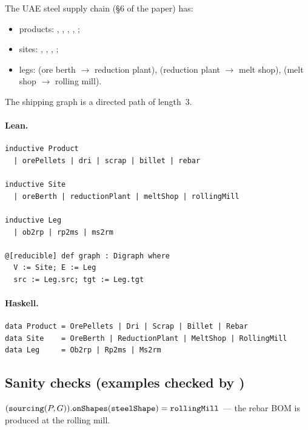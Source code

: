 \documentclass[11pt,a4paper]{article}
\begin{document}
\begin{defn}
The UAE steel supply chain (\S6 of the paper) has:
\begin{itemize}
  \item products: , , , ,
    ;
  \item sites: , , ,
    ;
  \item legs:  (ore berth $\to$ reduction plant), 
    (reduction plant $\to$ melt shop),  (melt shop $\to$ rolling mill).
\end{itemize}
The shipping graph is a directed path of length~3.
\end{defn}

\paragraph{Lean.}
\begin{lstlisting}[style=lean]
inductive Product
  | orePellets | dri | scrap | billet | rebar

inductive Site
  | oreBerth | reductionPlant | meltShop | rollingMill

inductive Leg
  | ob2rp | rp2ms | ms2rm

@[reducible] def graph : Digraph where
  V := Site; E := Leg
  src := Leg.src; tgt := Leg.tgt
\end{lstlisting}

\paragraph{Haskell.}
\begin{lstlisting}[style=haskell]
data Product = OrePellets | Dri | Scrap | Billet | Rebar
data Site    = OreBerth | ReductionPlant | MeltShop | RollingMill
data Leg     = Ob2rp | Rp2ms | Ms2rm
\end{lstlisting}


\subsection{Sanity checks (examples checked by )}

\begin{prop}
$({\texttt{sourcing}}(P, G)).\texttt{onShapes}(\texttt{steelShape}) = \texttt{rollingMill}$
--- the rebar BOM is produced at the rolling mill.
\end{prop}
\end{document}
